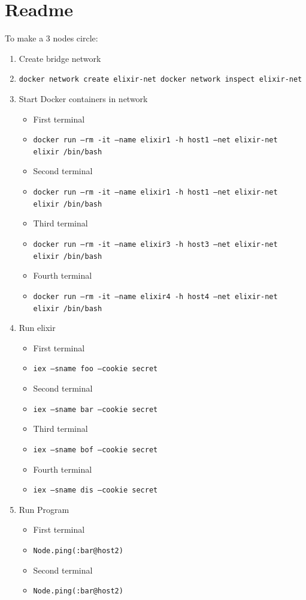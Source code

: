 \documentclass{article}
\begin{document}
 \section{Readme}
 To make a 3 nodes circle:
 \begin{enumerate}
  \item Create bridge network
  \item[] \texttt{docker network create elixir-net docker network inspect elixir-net }
  \item Start Docker containers in network
  \begin{itemize}
   \item First terminal
   \item[] \texttt{docker run –rm -it –name elixir1 -h host1 –net elixir-net elixir /bin/bash }
   \item Second terminal
   \item[] \texttt{docker run –rm -it –name elixir1 -h host1 –net elixir-net elixir /bin/bash}
   \item Third terminal
   \item[] \texttt{docker run –rm -it –name elixir3 -h host3 –net elixir-net elixir /bin/bash}
   \item Fourth terminal
   \item[] \texttt{docker run –rm -it –name elixir4 -h host4 –net elixir-net elixir /bin/bash}
  \end{itemize}
  \item Run elixir
  \begin{itemize}
   \item First terminal
   \item[] \texttt{iex --sname foo --cookie secret}
   \item Second terminal
   \item[] \texttt{iex --sname bar --cookie secret}
   \item Third terminal
   \item[] \texttt{iex --sname bof --cookie secret}
   \item Fourth terminal
   \item[] \texttt{iex --sname dis --cookie secret}
  \end{itemize}
  \item Run Program
  \begin{itemize}
   \item First terminal
   \item[] \texttt{Node.ping(:bar@host2)}
   \item Second terminal
   \item[] \texttt{Node.ping(:bar@host2)}

\end{itemize}
\end{enumerate}
\end{document}
